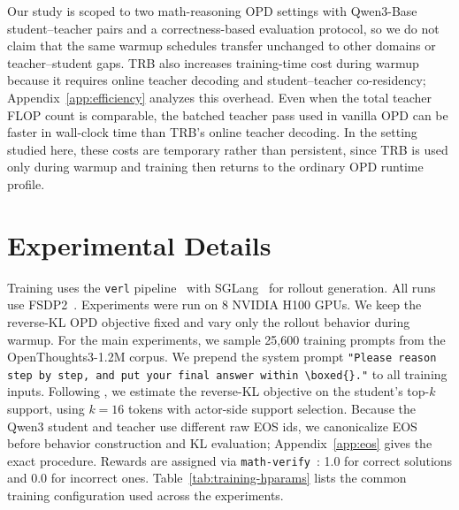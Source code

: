 \documentclass{llmxive}
\begin{document}
Our study is scoped to two math-reasoning OPD settings with Qwen3-Base student--teacher pairs and a correctness-based evaluation protocol, so we do not claim that the same warmup schedules transfer unchanged to other domains or teacher--student gaps. TRB also increases training-time cost during warmup because it requires online teacher decoding and student--teacher co-residency; Appendix~\ref{app:efficiency} analyzes this overhead. Even when the total teacher FLOP count is comparable, the batched teacher pass used in vanilla OPD can be faster in wall-clock time than TRB's online teacher decoding. In the setting studied here, these costs are temporary rather than persistent, since TRB is used only during warmup and training then returns to the ordinary OPD runtime profile.





\appendix


\section{Experimental Details}
\label{app:exp_details}

Training uses the \texttt{verl} pipeline~\citep{verl} with SGLang~\citep{sglang} for rollout generation. All runs use FSDP2~\citep{fsdp}.
Experiments were run on 8 NVIDIA H100 GPUs.
We keep the reverse-KL OPD objective fixed and vary only the rollout behavior during warmup.
For the main experiments, we sample 25{,}600 training prompts from the OpenThoughts3-1.2M corpus.
We prepend the system prompt \texttt{"Please reason step by step, and put your final answer within \textbackslash boxed\{\}."} to all training inputs.
Following \citet{li2026rethinking}, we estimate the reverse-KL objective on the student's top-$k$ support, using $k=16$ tokens with actor-side support selection. Because the Qwen3 student and teacher use different raw EOS ids, we canonicalize EOS before behavior construction and KL evaluation; Appendix~\ref{app:eos} gives the exact procedure.
Rewards are assigned via \texttt{math-verify}~\citep{mathverify}: 1.0 for correct solutions and 0.0 for incorrect ones.
Table~\ref{tab:training-hparams} lists the common training configuration used across the experiments.
\end{document}
